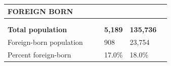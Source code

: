 \documentclass[9pt]{report}
\begin{document}
\newpage
\setlength{\tabcolsep}{.01in} %
\begin{tabular}{p{.10in}p{.10in}p{.10in}p{3.7in}>{\hfill}p{.85in}>{\hfill}p{.85in}>{\hfill}p{.85in}>{\hfill}p{.85in}p{0.1in}}
\multicolumn{9}{l}{\parbox{7.1in}{\raggedright{\large{\strut\textbf{FOREIGN BORN}\strut}}}} \\ 
\hline
\multicolumn{4}{l}{\parbox{3.5in}{\raggedright{\textbf{}}}} & \multicolumn{1}{r}{\parbox{.85in}{\strut\raggedleft{\textbf{}\strut}}} & \multicolumn{1}{r}{\parbox{.85in}{\strut\raggedleft{\textbf{}\strut}}} & \multicolumn{1}{r}{\parbox{.85in}{\strut{}}} & \multicolumn{1}{r}{\parbox{.85in}{\strut{}}} & \\ 
\multicolumn{9}{l}{} \\ 
\multicolumn{4}{l}{\parbox{3.5in}{\strut\raggedright{\textbf{Total population}\strut}}} & \textbf{} & \textbf{} & \textbf{5,189} & \textbf{135,736} & \textbf{} \\ 
\multicolumn{4}{l}{\parbox{3.6in}{\strut\raggedright{{Foreign-born population}}\strut}} &  &  & 908 & 23,754 & \multicolumn{1}{l}{}  \\ 
\multicolumn{4}{l}{\parbox{3.6in}{\strut\raggedright{{Percent foreign-born}}\strut}} &  &  & 17.0\% & 18.0\% & \multicolumn{1}{l}{}  \\ 

\end{tabular}
\setlength{\tabcolsep}{6pt} %
\end{document}
